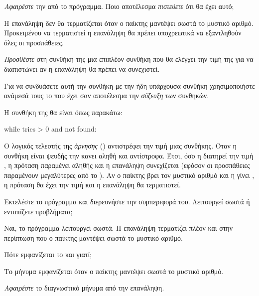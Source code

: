 \documentclass[a4paper,11pt,oneside]{book}
\begin{document}
\begin{step}
\emph{Αφαιρέστε} την  από το πρόγραμμα. Ποιο αποτέλεσμα \emph{πιστεύετε} ότι θα έχει αυτό;

\begin{answer}
Η επανάληψη δεν θα τερματίζεται όταν ο παίκτης μαντέψει σωστά το μυστικό αριθμό. Προκειμένου να τερματιστεί η επανάληψη θα πρέπει υποχρεωτικά να εξαντληθούν όλες οι προσπάθειες.
\end{answer}

\emph{Προσθέστε} στη συνθήκη της  μια επιπλέον συνθήκη που θα ελέγχει την τιμή της  για να διαπιστώνει αν η επανάληψη θα πρέπει να συνεχιστεί.

Για να συνδυάσετε αυτή την συνθήκη με την ήδη υπάρχουσα συνθήκη  χρησιμοποιήστε ανάμεσά τους το  που έχει σαν αποτέλεσμα την \emph{σύζευξη} των συνθηκών.

\begin{answer}
Η συνθήκη της  θα είναι όπως παρακάτω:

\begin{pynew}
while tries > 0 and not found:
\end{pynew}

Ο λογικός τελεστής της \emph{άρνησης} () αντιστρέφει την τιμή μιας συνθήκης. Όταν η συνθήκη είναι ψευδής την κανει αληθή και αντίστροφα. Έτσι, όσο η  διατηρεί την τιμή , η πρόταση  παραμένει αληθής και η επανάληψη συνεχίζεται (εφόσον οι προσπάθειες παραμένουν μεγαλύτερες από το ). Αν ο παίκτης βρει τον μυστικό αριθμό και η  γίνει , η πρόταση  θα έχει την τιμή  και η επανάληψη θα τερματιστεί.
\end{answer}

Εκτελέστε το πρόγραμμα και διερευνήστε την συμπεριφορά του. Λειτουργεί σωστά ή εντοπίζετε προβλήματα;

\begin{answer}
Ναι, το πρόγραμμα λειτουργεί σωστά. Η επανάληψη τερματίζει πλέον και στην περίπτωση που ο παίκτης μαντέψει σωστά το μυστικό αριθμό.
\end{answer}

Πότε εμφανίζεται το  και γιατί;

\begin{answer}
Το μήνυμα εμφανίζεται όταν ο παίκτης μαντέψει σωστά το μυστικό αριθμό.
\end{answer}

\emph{Αφαιρέστε} το διαγνωστικό μήνυμα από την επανάληψη.
\end{step}
\end{document}
